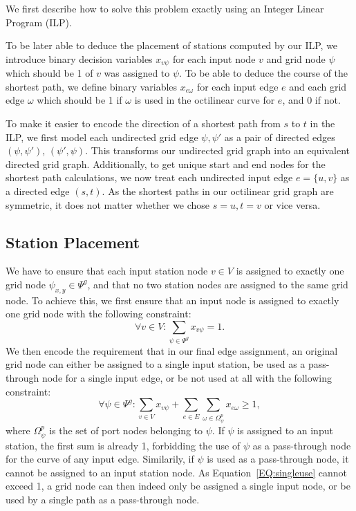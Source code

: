 \documentclass{sig-alternate-sigmod09}
\begin{document}
We first describe how to solve this problem exactly using an Integer Linear Program (ILP).

To be later able to deduce the placement of stations computed by our ILP, we introduce binary decision variables $x_{v\psi}$ for each input node $v$ and grid node $\psi$ which should be 1 of $v$ was assigned to $\psi$.
To be able to deduce the course of the shortest path, we define binary variables $x_{e\omega}$ for each input edge $e$ and each grid edge $\omega$ which should be 1 if $\omega$ is used in the octilinear curve for $e$, and 0 if not.

To make it easier to encode the direction of a shortest path from $s$ to $t$ in the ILP, we first model each undirected grid edge ${\psi, \psi'}$ as a pair of directed edges $(\psi, \psi')$, $(\psi', \psi)$.
This transforms our undirected grid graph into an equivalent directed grid graph.
Additionally, to get unique start and end nodes for the shortest path calculations, we now treat each undirected input edge $e = \{u, v\}$ as a directed edge $(s, t)$.
As the shortest paths in our octilinear grid graph are symmetric, it does not matter whether we chose $s = u, t = v$ or vice versa.

\subsection{Station Placement}

We have to ensure that each input station node $v \in V$ is assigned to exactly one grid node $\psi_{x, y} \in \Psi^g$, and that no two station nodes are assigned to the same grid node.
To achieve this, we first ensure that an input node is assigned to exactly one grid node with the following constraint:
%
\begin{equation}
  \forall v \in V: \sum_{\psi \in \Psi^g} x_{v\psi} = 1. \label{EQ:todo}
\end{equation}
%
We then encode the requirement that in our final edge assignment, an original grid node can either be assigned to a single input station, be used as a pass-through node for a single input edge, or be not used at all with the following constraint:
%
\begin{equation}
  \forall \psi \in \Psi^g: \sum_{v \in V} x_{v\psi} + \sum_{e \in E} \sum_{\omega \in \Omega^p_\psi} x_{e\omega} \geq 1, \label{EQ:singleuse}
\end{equation}
%
where $\Omega^p_\psi$ is the set of port nodes belonging to $\psi$. 
If $\psi$ is assigned to an input station, the first sum is already 1, forbidding the use of $\psi$ as a pass-through node for the curve of any input edge.
Similarily, if $\psi$ is used as a pass-through node, it cannot be assigned to an input station node.
As Equation~\ref{EQ:singleuse} cannot exceed 1, a grid node can then indeed only be assigned a single input node, or be used by a single path as a pass-through node.
\end{document}
